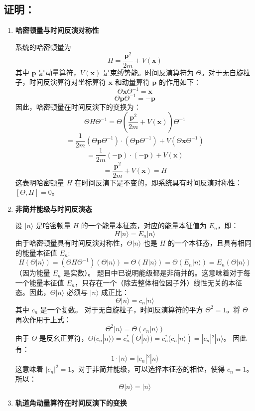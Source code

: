 \documentclass{article}
\begin{document}
\subsection*{证明：}
\begin{enumerate}
\item \textbf{哈密顿量与时间反演对称性}

系统的哈密顿量为
\[ H = \frac{\mathbf{p}^2}{2m} + V(\mathbf{x}) \]
其中 \(\mathbf{p}\) 是动量算符，\(V(\mathbf{x})\) 是束缚势能。时间反演算符为 \(\Theta\)。对于无自旋粒子，时间反演算符对坐标算符 \(\mathbf{x}\) 和动量算符 \(\mathbf{p}\) 的作用如下：
\[ \Theta \mathbf{x} \Theta^{-1} = \mathbf{x} \]
\[ \Theta \mathbf{p} \Theta^{-1} = -\mathbf{p} \]
因此，哈密顿量在时间反演下的变换为：
\[ \Theta H \Theta^{-1} = \Theta \left( \frac{\mathbf{p}^2}{2m} + V(\mathbf{x}) \right) \Theta^{-1} \]
\[ = \frac{1}{2m} (\Theta \mathbf{p} \Theta^{-1}) \cdot (\Theta \mathbf{p} \Theta^{-1}) + V(\Theta \mathbf{x} \Theta^{-1}) \]
\[ = \frac{1}{2m} (-\mathbf{p}) \cdot (-\mathbf{p}) + V(\mathbf{x}) \]
\[ = \frac{\mathbf{p}^2}{2m} + V(\mathbf{x}) = H \]
这表明哈密顿量 \(H\) 在时间反演下是不变的，即系统具有时间反演对称性：\([\Theta, H] = 0\)。

\item \textbf{非简并能级与时间反演态}

设 \(|n\rangle\) 是哈密顿量 \(H\) 的一个能量本征态，对应的能量本征值为 \(E_n\)，即：
\[ H |n\rangle = E_n |n\rangle \]
由于哈密顿量具有时间反演对称性，\(\Theta |n\rangle\) 也是 \(H\) 的一个本征态，且具有相同的能量本征值 \(E_n\):
\[ H (\Theta |n\rangle) = (\Theta H \Theta^{-1}) (\Theta |n\rangle) = \Theta (H |n\rangle) = \Theta (E_n |n\rangle) = E_n (\Theta |n\rangle) \]
（因为能量 \(E_n\) 是实数）。
题目中已说明能级都是非简并的。这意味着对于每一个能量本征值 \(E_n\)，只存在一个（除去整体相位因子外）线性无关的本征态。因此，\(\Theta |n\rangle\) 必须与 \(|n\rangle\) 成正比：
\[ \Theta |n\rangle = c_n |n\rangle \]
其中 \(c_n\) 是一个复数。
对于无自旋粒子，时间反演算符的平方 \(\Theta^2 = 1\)。将 \(\Theta\) 再次作用于上式：
\[ \Theta^2 |n\rangle = \Theta (c_n |n\rangle) \]
由于 \(\Theta\) 是反幺正算符，\(\Theta (c_n |n\rangle) = c_n^* (\Theta |n\rangle) = c_n^* (c_n |n\rangle) = |c_n|^2 |n\rangle\)。
因此有：
\[ 1 \cdot |n\rangle = |c_n|^2 |n\rangle \]
这意味着 \(|c_n|^2 = 1\)。对于非简并能级，可以选择本征态的相位，使得 \(c_n = 1\)。所以：
\[ \Theta |n\rangle = |n\rangle \]

\item \textbf{轨道角动量算符在时间反演下的变换}


\end{enumerate}
\end{document}
